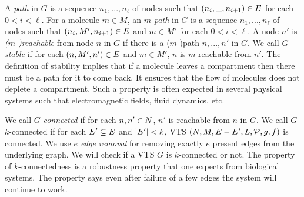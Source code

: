 
%
%
\vspace{0.2cm}
\noindent
A {\em path} in $G$ is a sequence $n_1,...,n_\ell$ of nodes 
such that $(n_i,\_,n_{i+1}) \in E$ for each $ 0 < i < \ell$.
%
For a molecule $m \in M$,
an {\em $m$-path} in $G$ is a sequence $n_1,...,n_\ell$ of nodes 
such that $(n_i,M',n_{i+1}) \in E$ and $m \in M'$ for
each $ 0 < i < \ell$.
%
A node $n'$ is {\em ($m$-)reachable} from node $n$ in $G$ if there is a ($m$-)path
$n,...,n'$ in $G$.
%
%
We call $G$ {\em stable} if for each $(n,M',n') \in E$ and $m \in M'$,
$n$ is $m$-reachable from $n'$.
%
The definition of stability implies that if a molecule leaves a
compartment then there must be a path for it to come back.
%
It ensures that the flow of molecules does not deplete a
compartment.
%
Such a property is often expected in several physical systems
such that electromagnetic fields, fluid dynamics, etc.

%
We call $G$ {\em connected} if for each $n,n' \in N$,
$n'$ is reachable from $n$ in $G$.
%
We call $G$ $k$-connected if for each $E' \subseteq E$ and
$|E'| < k$, VTS
$(N,M,E-E',L,\mathcal{P},g,f)$ is connected.
%
We use \textit{$e$ edge removal} for removing exactly $e$ present edges from the underlying graph.
%
We will check if a VTS $G$ is $k$-connected or not.
%
The property of $k$-connectedness is a robustness property that one
expects from biological systems.
%
The property says even after failure of a few edges the system will continue to work.

